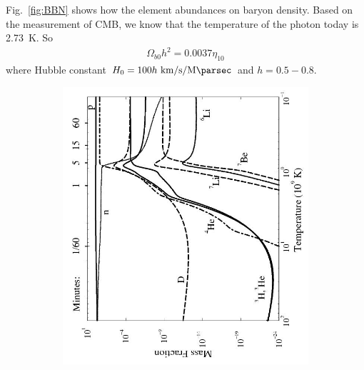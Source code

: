 Fig.~\ref{fig:BBN} shows how the element abundances on baryon density. Based on the measurement of CMB, we know that the temperature of the photon today is \SI{2.73}{\kelvin}. So
\begin{align}
\Omega_{b0} h^2 = \num{0.0037} \eta_{10}
\end{align}
where Hubble constant $H_0= 100 h\ \si{\km\per\second\per\mega\parsec}$ and $h=0.5-0.8$.
\begin{figure}[p]
	\centering
	\begin{subfigure}[b]{\figurewidth}
		\centering
		\includegraphics[width=\halfwidth,clip,trim={0 0 0 0},angle=270,origin=c]{Figures/Intro/BBNMassFraction.jpg}
		\caption{}
		\label{fig:BBNa}
	\end{subfigure}
	\begin{subfigure}[b]{\figurewidth}
		\centering

\end{subfigure}
\end{figure}
